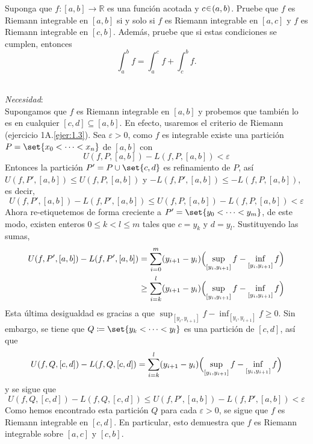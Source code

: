 
\setcounter{eje}{9} %
\begin{ejer}
Suponga que $f\colon [a, b] \to \mathbb{R}$ es una función acotada y $c \en (a, b)$. Pruebe que $f$ es Riemann integrable en $[a, b]$ si y solo si $f$ es Riemann integrable en $[a, c]$ y $f$ es Riemann integrable en $[c, b]$. Además, pruebe que si estas condiciones se cumplen, entonces
$$
\int_a^b f = \int_a^c f + \int_c^b f.
$$
\end{ejer}
\begin{sol}\vphantom{s}\vspace{1em}\\
\emph{Necesidad}:\\
Supongamos que $f$ es Riemann integrable en $[a,b]$ y probemos que también lo es en cualquier $[c,d] \subseteq [a,b]$. En efecto, usaremos el criterio de Riemann (ejercicio 1A.\ref{ejer:1.3}). Sea $\varepsilon >0$, como $f$ es integrable existe una partición $P = \set{x_0<\cdots<x_n}$ de $[a,b]$ con
\[
U(f,P,[a,b]) - L(f,P,[a,b]) < \varepsilon
\]
Entonces la partición $P' = P \cup \set{c,d}$ es refinamiento de $P$, así $U(f,P',[a,b]) \leq U(f,P,[a,b])$ y $-L(f,P',[a,b]) \leq -L(f,P,[a,b])$, es decir,
\[
U(f,P',[a,b]) - L(f,P',[a,b]) \leq U(f,P,[a,b]) - L(f,P,[a,b]) < \varepsilon
\]
Ahora re-etiquetemos de forma creciente a $P' = \set{y_0 < \cdots< y_m}$, de este modo, existen enteros $0 \leq k<l\leq m$ tales que $c = y_k$ y $d=y_l$. Sustituyendo las sumas,
\begin{align*}
U(f,P',[a,b]) - L(f,P',[a,b])%
&= \sum^m_{i=0}(y_{i+1}-y_i)\Bigl(\sup_{[y_i,y_{i+1}]} f - \inf_{[y_i,y_{i+1}]} f\Bigr)\\
&\ge \sum^l_{i=k}(y_{i+1}-y_i)\Bigl(\sup_{[y_i,y_{i+1}]} f - \inf_{[y_i,y_{i+1}]} f\Bigr)
\end{align*}
Esta última desigualdad es gracias a que $\sup_{[y_i,y_{i+1}]} f - \inf_{[y_i,y_{i+1}]} f \geq 0$. Sin embargo, se tiene que $Q \coloneq \set{y_k < \cdots<y_l}$ es una partición de $[c,d]$, así que
\[
U(f,Q,[c,d]) - L(f,Q,[c,d]) = \sum^l_{i=k}(y_{i+1}-y_i)\Bigl(\sup_{[y_i,y_{i+1}]} f - \inf_{[y_i,y_{i+1}]} f\Bigr)
\]
y se sigue que
\[
U(f,Q,[c,d]) - L(f,Q,[c,d]) \leq U(f,P',[a,b]) - L(f,P',[a,b]) < \varepsilon
\]
Como hemos encontrado esta partición $Q$ para cada $\varepsilon>0$, se sigue que $f$ es Riemann integrable en $[c,d]$. En particular, esto demuestra que $f$ es Riemann integrable sobre $[a,c]$ y $[c,b]$. \vspace{1em}\\ 

\end{sol}
